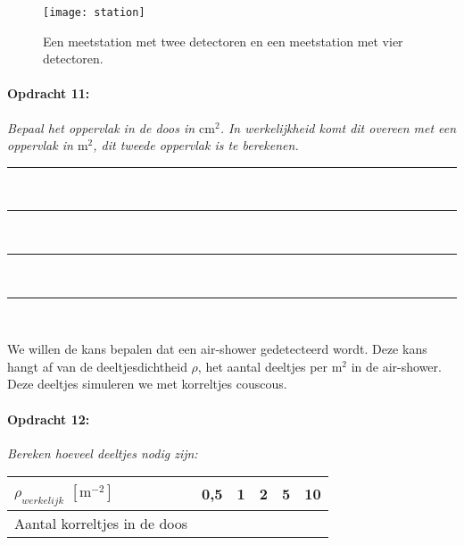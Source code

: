 \begin{figure}[p]
    \centering
    \texttt{[image: station]}
    \caption{Een meetstation met twee detectoren en een
    meetstation met vier detectoren.}
    \label{fig:Meetstations}
\end{figure}

\begin{minipage}[t]{\columnwidth}%

\paragraph{Opdracht 11:}

\textit{Bepaal het oppervlak in de doos in $\mathrm{cm^{2}}$. In
werkelijkheid komt dit overeen met een oppervlak in $\mathrm{m^{2}}$,
dit tweede oppervlak is te berekenen.}

\begin{center}
    \rule{\textwidth}{0.3mm}\\
    \rule{\textwidth}{0.3mm}\\
    \rule{\textwidth}{0.3mm}\\
    \rule{\textwidth}{0.3mm}\\
\end{center}
\end{minipage}\bigskip{}

We willen de kans bepalen dat een air-shower gedetecteerd wordt. Deze
kans hangt af van de deeltjesdichtheid $\rho$, het aantal deeltjes
per $\mathrm{m^{2}}$ in de air-shower. Deze deeltjes simuleren we
met korreltjes couscous.

\begin{minipage}[t]{1\columnwidth}%

\paragraph{Opdracht 12:}

\textit{Bereken hoeveel deeltjes nodig zijn:}

\bigskip{}

\begin{tabular}{|x{.3\textwidth}|x{.1\textwidth}|x{.1\textwidth}
                |x{.1\textwidth}|x{.1\textwidth}|x{.1\textwidth}|}
    \hline 
    $\rho_{werkelijk}$ $\left[\mathrm{m^{-2}}\right]$ & 0,5 & 1 & 2 & 5 & 10 \\
    \hline 
    Aantal korreltjes in de doos &  &  &  &  & \\
    \hline 
    \end{tabular}%
\end{minipage}

